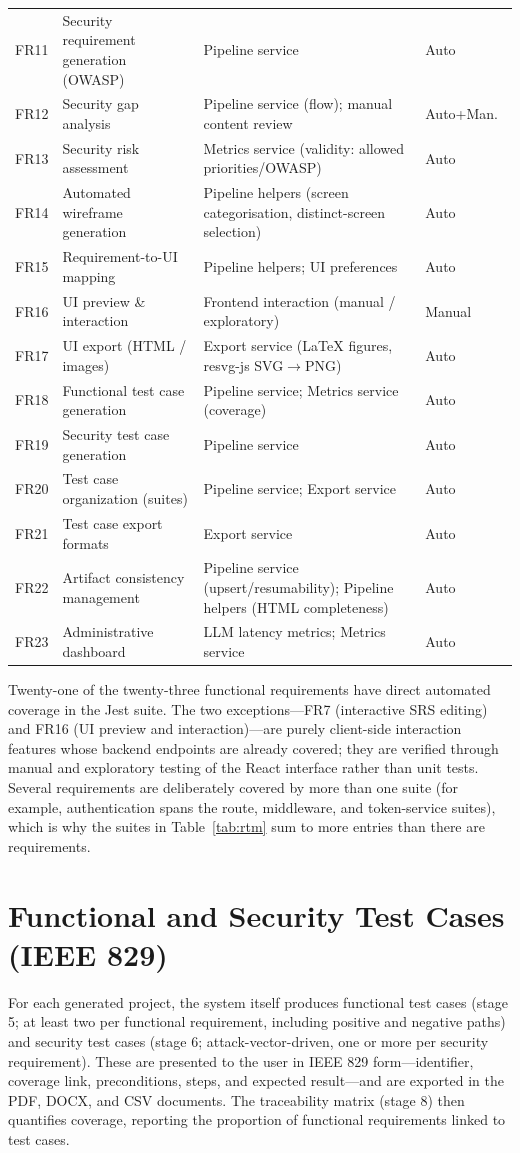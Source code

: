 \documentclass[12pt,a4paper,oneside]{report}
\begin{document}
\begin{longtable}{L{0.9cm} L{3.7cm} L{6.1cm} L{1.5cm}}
FR11 & Security requirement generation (OWASP) & Pipeline service & Auto \\
FR12 & Security gap analysis & Pipeline service (flow); manual content review & Auto+Man.\ \\
FR13 & Security risk assessment & Metrics service (validity: allowed priorities/OWASP) & Auto \\
FR14 & Automated wireframe generation & Pipeline helpers (screen categorisation, distinct-screen selection) & Auto \\
FR15 & Requirement-to-UI mapping & Pipeline helpers; UI preferences & Auto \\
FR16 & UI preview \& interaction & Frontend interaction (manual / exploratory) & Manual \\
FR17 & UI export (HTML / images) & Export service (LaTeX figures, resvg-js SVG$\rightarrow$PNG) & Auto \\
FR18 & Functional test case generation & Pipeline service; Metrics service (coverage) & Auto \\
FR19 & Security test case generation & Pipeline service & Auto \\
FR20 & Test case organization (suites) & Pipeline service; Export service & Auto \\
FR21 & Test case export formats & Export service & Auto \\
FR22 & Artifact consistency management & Pipeline service (upsert/resumability); Pipeline helpers (HTML completeness) & Auto \\
FR23 & Administrative dashboard & LLM latency metrics; Metrics service & Auto \\
\bottomrule
\end{longtable}

\noindent Twenty-one of the twenty-three functional requirements have direct automated coverage in the Jest suite. The two exceptions---FR7 (interactive SRS editing) and FR16 (UI preview and interaction)---are purely client-side interaction features whose backend endpoints are already covered; they are verified through manual and exploratory testing of the React interface rather than unit tests. Several requirements are deliberately covered by more than one suite (for example, authentication spans the route, middleware, and token-service suites), which is why the suites in Table~\ref{tab:rtm} sum to more entries than there are requirements.

\section{Functional and Security Test Cases (IEEE 829)}
For each generated project, the system itself produces functional test cases (stage 5; at least two per functional requirement, including positive and negative paths) and security test cases (stage 6; attack-vector-driven, one or more per security requirement). These are presented to the user in IEEE 829 form---identifier, coverage link, preconditions, steps, and expected result---and are exported in the PDF, DOCX, and CSV documents. The traceability matrix (stage 8) then quantifies coverage, reporting the proportion of functional requirements linked to test cases.
\end{document}
